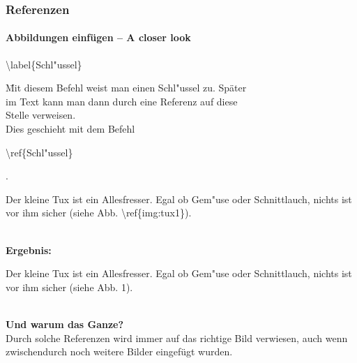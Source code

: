 
\begin{frame}
\frametitle{Referenzen}
\framesubtitle{Abbildungen einfügen – A closer look}
\begin{tabbing}
\begin{ttfamily}\color{nounibaredI}\textbackslash label\color{black}\{Schl"ussel\}\end{ttfamily} \= Mit diesem Befehl weist man einen Schl"ussel zu. Später\\
\> im Text kann man dann durch eine Referenz auf diese\\
\> Stelle verweisen.\\
\> Dies geschieht mit dem Befehl
\begin{ttfamily}\color{nounibaredI}\textbackslash ref\color{black}\{Schl"ussel\}\end{ttfamily}.
\end{tabbing}
\begin{ttfamily}Der kleine Tux ist ein Allesfresser. Egal ob Gem"use oder
Schnittlauch, nichts ist vor ihm sicher (siehe Abb.
\color{nounibaredI}\textbackslash ref\color{black}\{img:tux1\}).\end{ttfamily}\\[3mm]
\textbf{Ergebnis:}\\[3mm]
\begin{minipage}{\textwidth}\begin{rm}
Der kleine Tux ist ein Allesfresser. Egal ob Gem"use oder
Schnittlauch, nichts ist vor ihm sicher (siehe Abb.
1).\end{rm} \end{minipage}\\[3mm]
\textbf{Und warum das Ganze?}\\
Durch solche Referenzen wird immer auf das richtige Bild verwiesen, auch wenn zwischendurch noch weitere Bilder eingefügt wurden.
\end{frame}


